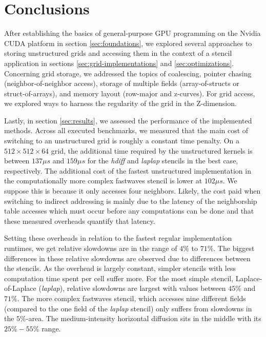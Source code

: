 \chapter{Conclusions}

After establishing the basics of general-purpose GPU programming on the Nvidia CUDA platform in section \ref{sec:foundations}, we explored several approaches to storing unstructured grids and accessing them in the context of a stencil application in sections \ref{sec:grid-implementations} and \ref{sec:optimizations}. Concerning grid storage, we addressed the topics of coalescing, pointer chasing (neighbor-of-neighbor access), storage of multiple fields (array-of-structs or struct-of-arrays), and memory layout (row-major and z-curves). For grid access, we explored ways to harness the regularity of the grid in the Z-dimension. 

Lastly, in section \ref{sec:results}, we assessed the performance of the implemented methods. Across all executed benchmarks, we measured that the main cost of switching to an unstructured grid is roughly a constant time penalty. On a $512\times 512\times 64$ grid, the additional time required by the unstructured kernels is between $137 \mu s$ and $159 \mu s$ for the \emph{hdiff} and \emph{laplap} stencils in the best case, respectively. The additional cost of the fastest unstructured implementation in the computationally more complex fastwaves stencil is lower at $102 \mu s$. We suppose this is because it only accesses four neighbors. Likely, the cost paid when switching to indirect addressing is mainly due to the latency of the neighborship table accesses which must occur before any computations can be done and that these measured overheads quantify that latency.

Setting these overheads in relation to the fastest regular implementation runtimes, we get relative slowdowns are in the range of $4\%$ to $71\%$. The biggest differences in these relative slowdowns are observed due to differences between the stencils. As the overhead is largely constant, simpler stencils with less computation time spent per cell suffer more. For the most simple stencil, Laplace-of-Laplace (\emph{laplap}), relative slowdowns are largest with values between $45\%$ and $71\%$. The more complex fastwaves stencil, which accesses nine different fields (compared to the one field of the \emph{laplap} stencil) only suffers from slowdowns in the $5\%$-area. The medium-intensity horizontal diffusion sits in the middle with its $25\% - 55\%$ range. 

